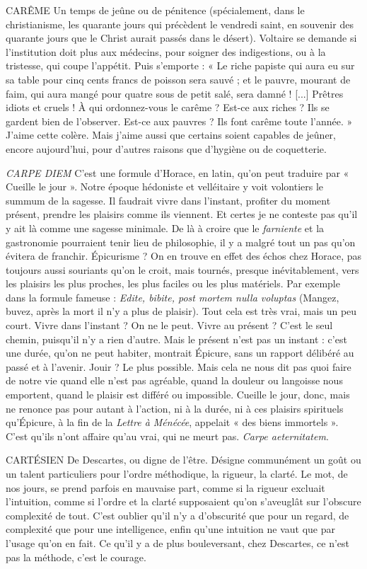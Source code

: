 CARÊME Un temps de jeûne ou de pénitence (spécialement, dans le christianisme,
les quarante jours qui précèdent le vendredi saint, en
souvenir des quarante jours que le Christ aurait passés dans le désert). Voltaire
se demande si l'institution doit plus aux médecins, pour soigner des indigestions,
ou à la tristesse, qui coupe l'appétit. Puis s’emporte : « Le riche papiste
qui aura eu sur sa table pour cinq cents francs de poisson sera sauvé ; et le
pauvre, mourant de faim, qui aura mangé pour quatre sous de petit salé, sera
damné ! [...] Prêtres idiots et cruels ! À qui ordonnez-vous le carême ? Est-ce
aux riches ? Ils se gardent bien de l’observer. Est-ce aux pauvres ? Ils font
carême toute l’année. » J'aime cette colère. Mais j'aime aussi que certains soient
capables de jeûner, encore aujourd’hui, pour d’autres raisons que d’hygiène ou
de coquetterie.

{\it CARPE DIEM} C’est une formule d'Horace, en latin, qu’on peut traduire
par « Cueille le jour ». Notre époque hédoniste et velléitaire
y voit volontiers le summum de la sagesse. Il faudrait vivre dans l’instant, profiter
du moment présent, prendre les plaisirs comme ils viennent. Et certes je
ne conteste pas qu'il y ait là comme une sagesse minimale. De là à croire que le
{\it farniente} et la gastronomie pourraient tenir lieu de philosophie, il y a malgré
tout un pas qu’on évitera de franchir. Épicurisme ? On en trouve en effet des
échos chez Horace, pas toujours aussi souriants qu’on le croit, mais tournés,
presque inévitablement, vers les plaisirs les plus proches, les plus faciles ou les
plus matériels. Par exemple dans la formule fameuse : {\it Edite, bibite, post mortem
nulla voluptas} (Mangez, buvez, après la mort il n’y a plus de plaisir). Tout cela
est très vrai, mais un peu court. Vivre dans l’instant ? On ne le peut. Vivre au
présent ? C’est le seul chemin, puisqu’il n’y a rien d’autre. Mais le présent n’est
pas un instant : c’est une durée, qu’on ne peut habiter, montrait Épicure, sans
un rapport délibéré au passé et à l'avenir. Jouir ? Le plus possible. Mais cela ne
nous dit pas quoi faire de notre vie quand elle n’est pas agréable, quand la douleur
ou langoisse nous emportent, quand le plaisir est différé ou impossible.
Cueille le jour, donc, mais ne renonce pas pour autant à l’action, ni à la durée,
ni à ces plaisirs spirituels qu’Épicure, à la fin de la {\it Lettre à Ménécée}, appelait
« des biens immortels ». C’est qu'ils n’ont affaire qu’au vrai, qui ne meurt pas.
{\it Carpe aeternitatem}.

CARTÉSIEN De Descartes, ou digne de l’être. Désigne communément un
goût ou un talent particuliers pour l’ordre méthodique, la
rigueur, la clarté. Le mot, de nos jours, se prend parfois en mauvaise part,
comme si la rigueur excluait l'intuition, comme si l’ordre et la clarté supposaient
qu’on s’aveuglât sur l’obscure complexité de tout. C’est oublier qu’il n’y
a d’obscurité que pour un regard, de complexité que pour une intelligence,
enfin qu’une intuition ne vaut que par l’usage qu’on en fait. Ce qu’il y a de plus
bouleversant, chez Descartes, ce n’est pas la méthode, c’est le courage.

